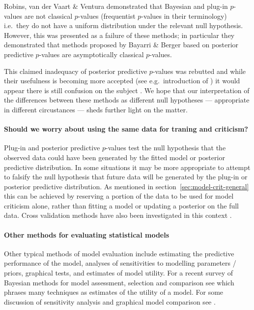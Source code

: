 \documentclass{article} %
\def\ie{i.e.\ }
\def\eg{e.g.\ }
\begin{document}
Robins, van der Vaart \& Ventura \citep{Robins2000-oz} demonstrated that Bayesian and plug-in $p$-values are not classical $p$-values (frequentist $p$-values in their terminology) \ie they do not have a uniform distribution under the relevant null hypothesis.
However, this was presented as a failure of these methods; in particular they demonstrated that methods proposed by Bayarri \& Berger \citep{Bayarri1999-ty} based on posterior predictive $p$-values are asymptotically classical $p$-values.

This claimed inadequacy of posterior predictive $p$-values was rebutted \citep{Gelman2003-xx} and while their usefulness is becoming more accepted (see \eg introduction of \cite{Bayarri2007-cp}) it would appear there is still confusion on the subject \citep{Gelman2013-am}.
We hope that our interpretation of the differences between these methods as different null hypotheses --- appropriate in different circustances --- sheds further light on the matter.

\paragraph{Should we worry about using the same data for traning and criticism?}

Plug-in and posterior predictive $p$-values test the null hypothesis that the observed data could have been generated by the fitted model or posterior predictive distribution.
In some situations it may be more appropriate to attempt to falsify the null hypothesis that future data will be generated by the plug-in or posterior predictive distribution.
As mentioned in section~\ref{sec:model-crit-general} this can be achieved by reserving a portion of the data to be used for model criticism alone, rather than fitting a model or updating a posterior on the full data.
Cross validation methods have also been investigated in this context \citep{Gelfand1992-ow, Marshall2007-hd}.

\paragraph{Other methods for evaluating statistical models}

Other typical methods of model evaluation include estimating the predictive performance of the model, analyses of sensitivities to modelling parameters / priors, graphical tests, and estimates of model utility.
For a recent survey of Bayesian methods for model assessment, selection and comparison see \cite{Vehtari2012-oh} which phrases many techniques as estimates of the utility of a model.
For some discussion of sensitivity analysis and graphical model comparison see \citep[e.g.][]{Gelman2013-st}.
\end{document}
